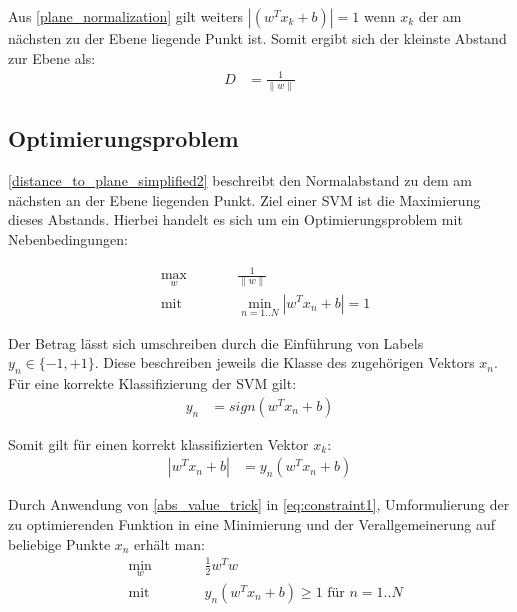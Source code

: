 \documentclass[a4paper,11pt,twoside]{scrreprt}
\newcommand{\norm}[1]{\lVert#1\rVert}
\begin{document}
Aus \autoref{plane_normalization} gilt weiters $| (w^{T} x_{k} + b) | = 1$ wenn $x_{k}$ der am nächsten zu der Ebene liegende Punkt ist. Somit ergibt sich der kleinste Abstand zur Ebene als:
\begin{equation} \label{distance_to_plane_simplified2}
	\begin{aligned}
		D &= \frac{1}{\norm{w}}
	\end{aligned}
\end{equation}

\subsection{Optimierungsproblem}

\autoref{distance_to_plane_simplified2} beschreibt den Normalabstand zu dem am nächsten an der Ebene liegenden Punkt. Ziel einer \ac{SVM} ist die Maximierung dieses Abstands. Hierbei handelt es sich um ein Optimierungsproblem mit Nebenbedingungen:

\begin{subequations}
	\begin{alignat}{2}
		&\!\max_{w}        &\qquad&  \frac{1}{\norm{w}} \label{eq:optProb}\\
		&\text{mit } &      & \min_{n=1..N} |w^{T} x_{n} + b| = 1 \label{eq:constraint1}
	\end{alignat}
\end{subequations}


Der Betrag lässt sich umschreiben durch die Einführung von Labels $y_{n} \in \{-1, +1\}$. Diese beschreiben jeweils die Klasse des zugehörigen Vektors $x_{n}$. Für eine korrekte Klassifizierung der \ac{SVM} gilt:
\begin{equation} \label{svm_classif}
	\begin{aligned}
		y_{n} &= sign(w^{T} x_{n} + b)
	\end{aligned}
\end{equation}

Somit gilt für einen korrekt klassifizierten Vektor $x_{k}$:
\begin{equation} \label{abs_value_trick}
	\begin{aligned}
		|w^{T} x_{n} + b| &= y_{n} (w^{T} x_{n} + b)
	\end{aligned}
\end{equation}


Durch Anwendung von \autoref{abs_value_trick} in \autoref{eq:constraint1}, Umformulierung der zu optimierenden Funktion in eine Minimierung und der Verallgemeinerung auf beliebige Punkte $x_{n}$ erhält man:
\begin{subequations}
	\begin{alignat}{2}
		&\!\min_{w}        &\qquad&  \frac{1}{2} w^{T} w \label{eq:optProb2}\\
		&\text{mit } &      & y_n (w^{T} x_{n} + b) \geq 1 \text{ für } n=1..N \label{eq:constraint12}
	\end{alignat}
\end{subequations}
\end{document}
